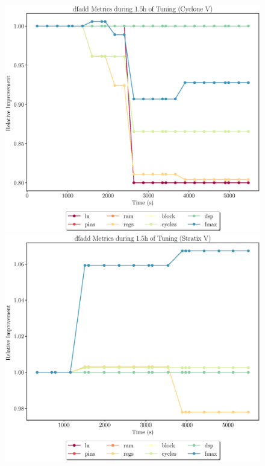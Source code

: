 \documentclass[12pt, a4paper]{article}
\begin{document}
\begin{figure}[htpb]
    \begin{minipage}{.48\textwidth}
        \includegraphics[scale=.25]{dfadd_all_5400_chstone_CycloneV}
    \end{minipage}%
    \hfill
    \begin{minipage}{.48\textwidth}
        \includegraphics[scale=.25]{dfadd_all_5400_chstone_StratixV}
    \end{minipage}%
\end{figure}
\end{document}

